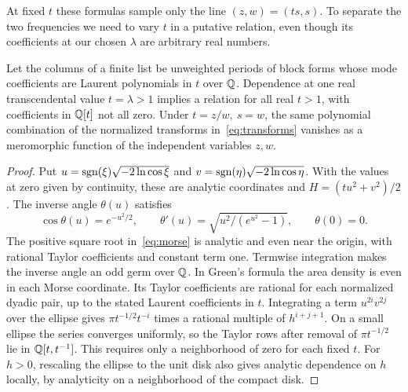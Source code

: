 At fixed $t$ these formulas sample only the line $(z,w)=(ts,s)$. To separate the two frequencies we need to vary $t$ in a putative relation, even though its coefficients at our chosen $\lambda$ are arbitrary real numbers.

\begin{lemma}\label{lem:lift}
Let the columns of a finite list be unweighted periods of block forms whose mode coefficients are Laurent polynomials in $t$ over $\mathbb Q$. Dependence at one real transcendental value $t=\lambda>1$ implies a relation for all real $t>1$, with coefficients in $\mathbb Q[t]$ not all zero. Under \(t=z/w,\ s=w\), the same polynomial combination of the normalized transforms in~\eqref{eq:transforms} vanishes as a meromorphic function of the independent variables \(z,w\).
\end{lemma}
\begin{proof}
Put $u=\operatorname{sgn}(\xi)\sqrt{-2\ln\cos\xi}$ and $v=\operatorname{sgn}(\eta)\sqrt{-2\ln\cos\eta}$. With the values at zero given by continuity, these are analytic coordinates and $H=(tu^2+v^2)/2$. The inverse angle $\theta(u)$ satisfies
\begin{equation}\label{eq:morse}
 \cos\theta(u)=e^{-u^2/2},\qquad
 \theta'(u)=\sqrt{u^2/(e^{u^2}-1)},\qquad \theta(0)=0 .
\end{equation}
The positive square root in~\eqref{eq:morse} is analytic and even near the origin, with rational Taylor coefficients and constant term one. Termwise integration makes the inverse angle an odd germ over \(\mathbb Q\). In Green's formula the area density is even in each Morse coordinate. Its Taylor coefficients are rational for each normalized dyadic pair, up to the stated Laurent coefficients in $t$. Integrating a term $u^{2i}v^{2j}$ over the ellipse gives $\pi t^{-1/2}t^{-i}$ times a rational multiple of $h^{i+j+1}$. On a small ellipse the series converges uniformly, so the Taylor rows after removal of $\pi t^{-1/2}$ lie in $\mathbb Q[t,t^{-1}]$. This requires only a neighborhood of zero for each fixed $t$. For $h>0$, rescaling the ellipse to the unit disk also gives analytic dependence on $h$ locally, by analyticity on a neighborhood of the compact disk.


\end{proof}
